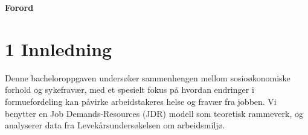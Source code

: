 \documentclass[
  11pt,
  a4paper,
  DIV=11,
  numbers=noendperiod]{scrartcl}
\renewcommand*\contentsname{Table of contents}
\newcommand\contentsname{Table of contents}
\begin{document}







\thispagestyle{plain}
\begin{center}
    \Large
    \textbf{Forord}
\end{center}






\newpage
\hypersetup{linkcolor=black}
\renewcommand{\contentsname}{Innholdsfortegnelse}
\renewcommand*{\figureautorefname}{Figur}
\renewcommand*{\tableautorefname}{Tabell}
\tableofcontents
\listoffigures
\listoftables
\hypersetup{linkcolor=blue}
\newpage

\section{1 Innledning}\label{innledning}

Denne bacheloroppgaven undersøker sammenhengen mellom sosioøkonomiske
forhold og sykefravær, med et spesielt fokus på hvordan endringer i
formuefordeling kan påvirke arbeidstakeres helse og fravær fra jobben.
Vi benytter en Job Demands-Resources (JDR) modell som teoretisk
rammeverk, og analyserer data fra Levekårsundersøkelsen om arbeidsmiljø.
\end{document}
